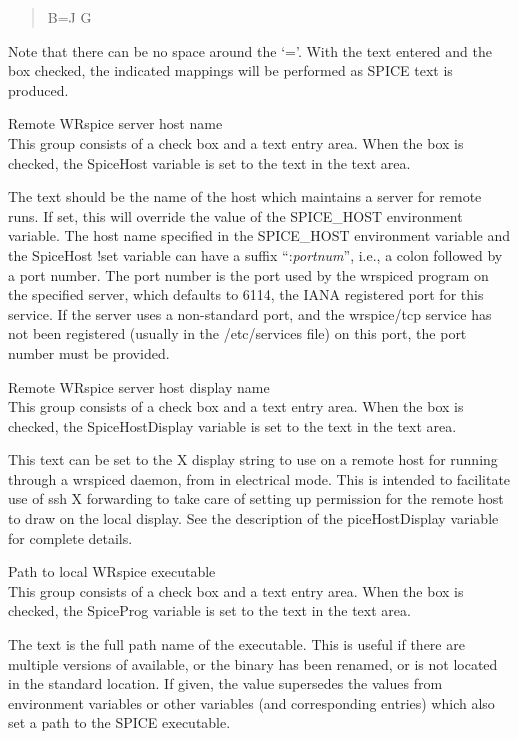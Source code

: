 \begin{description}
\begin{quote} \vt
B=J G
\end{quote}

Note that there can be no space around the `{\vt =}'.  With the text
entered and the box checked, the indicated mappings will be performed
as SPICE text is produced.

\item{\cb Remote WRspice server host name}\\
This group consists of a check box and a text entry area.  When the
box is checked, the {\et SpiceHost} variable is set to the text in the
text area.

The text should be the name of the host which maintains a server for
remote {\WRspice} runs.  If set, this will override the value of the
{\et SPICE\_HOST} environment variable.  The host name specified in
the {\et SPICE\_HOST} environment variable and the {\et SpiceHost}
{\cb !set} variable can have a suffix ``{\vt :}{\it portnum\/}'',
i.e., a colon followed by a port number.  The port number is the port
used by the {\vt wrspiced} program on the specified server, which
defaults to 6114, the IANA registered port for this service.  If the
server uses a non-standard port, and the {\vt wrspice/tcp} service has
not been registered (usually in the {\vt /etc/services} file) on this
port, the port number must be provided.

\item{\cb Remote WRspice server host display name}\\
This group consists of a check box and a text entry area.  When the
box is checked, the {\et SpiceHostDisplay} variable is set to the text
in the text area.

This text can be set to the X display string to use on a remote host
for running {\WRspice} through a {\vt wrspiced} daemon, from {\Xic} in
electrical mode.  This is intended to facilitate use of {\vt ssh} X
forwarding to take care of setting up permission for the remote host
to draw on the local display.  See the description of the {\et
piceHostDisplay} variable for complete details.

\item{\cb Path to local WRspice executable}\\
This group consists of a check box and a text entry area.  When the
box is checked, the {\et SpiceProg} variable is set to the text in the
text area.

The text is the full path name of the {\WRspice} executable.  This is
useful if there are multiple versions of {\WRspice} available, or the
binary has been renamed, or is not located in the standard location. 
If given, the value supersedes the values from environment variables
or other variables (and corresponding entries) which also set a path
to the SPICE executable.


\end{description}
